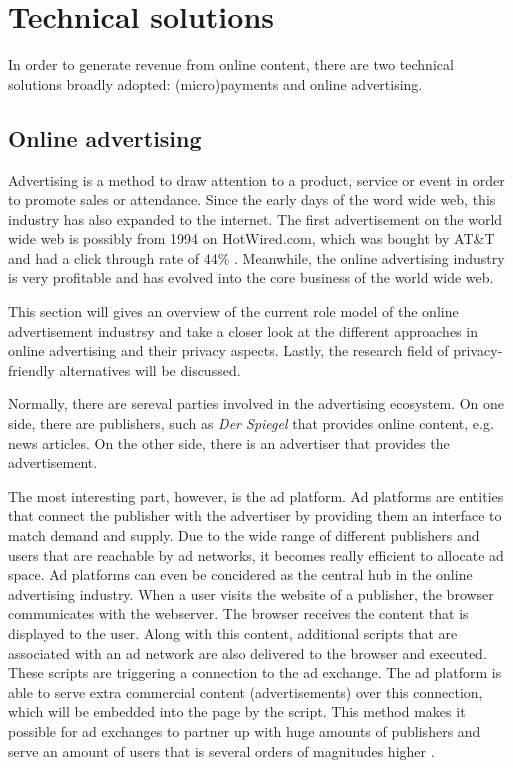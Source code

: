 \section{Technical solutions}

In order to generate revenue from online content, there are two technical solutions broadly adopted: (micro)payments and online advertising. 

\subsection{Online advertising}
Advertising is a method to draw attention to a product, service or event in order to promote sales or attendance. Since the early days of the word wide web, this industry has also expanded to the internet. The first advertisement on the world wide web is possibly from 1994 on HotWired.com, which was bought by AT\&T and had a click through rate of 44\% \cite{firstbanner}. Meanwhile, the online advertising industry is very profitable and has evolved into the core business of the world wide web.

This section will gives an overview of the current role model of the online advertisement industrsy and take a closer look at the different approaches in online advertising and their privacy aspects. Lastly, the research field of privacy-friendly alternatives will be discussed. 

Normally, there are sereval parties involved in the advertising ecosystem. On one side, there are publishers, such as \textit{Der Spiegel} that provides online content, e.g. news articles. On the other side, there is an advertiser that provides the advertisement.

The most interesting part, however, is the ad platform. Ad platforms are entities that connect the publisher with the advertiser by providing them an interface to match demand and supply. Due to the wide range of different publishers and users that are reachable by ad networks, it becomes really efficient to allocate ad space. Ad platforms can even be concidered as the central hub in the online advertising industry. When a user visits the website of a publisher, the browser communicates with the webserver. The browser receives the content that is displayed to the user. Along with this content, additional scripts that are associated with an ad network are also delivered to the browser and executed. These scripts are triggering a connection to the ad exchange. The ad platform is able to serve extra commercial content (advertisements) over this connection, which will be embedded into the page by the script. This method makes it possible for ad exchanges to partner up with huge amounts of publishers and serve an amount of users that is several orders of magnitudes higher \cite{estrada2017online}.


